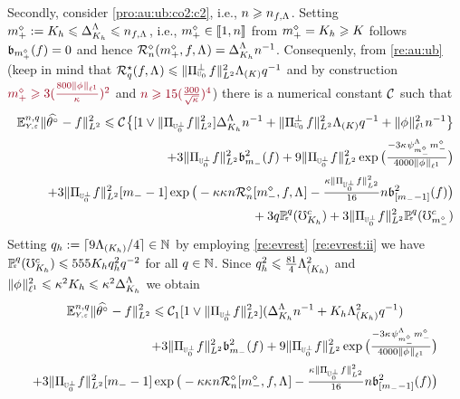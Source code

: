 \begin{pro}
Secondly, consider \ref{pro:au:ub:co2:c2}, i.e., 
$\ssY\geq\ssY_{\xdf,\iSv}$. Setting $\pdDi:=K_{\ydf}\leq\DipenSv[K_{\ydf}]\leq\ssY_{\xdf,\iSv}$, i.e., $\pdDi\in\nset{1,\ssY}$ from $\pdDi=K_{\ydf}\geq K$  follows
$\bias[\pdDi](\xdf)=0$ and hence
$\hRa{\pdDi,\xdf,\iSv}=\DipenSv[K_{\ydf}]\ssY^{-1}$. Consequenly, from
\cref{re:au:ub} (keep in mind that
$\mRa{\xdf,\iSv}\leq\VnormLp{\Proj[{\mHiH[0]}]^\perp\xdf}^2\miSv[K]\ssE^{-1}$
and by construction $\dr\pdDi\geq3(\tfrac{800\Vnormlp[1]{\fydf}}{\cpen})^2$  and  $\dr n\geq
  15(\tfrac{300}{\sqrt{\cpen}})^4$) there is a numerical constant
  $\cst{}$ such that 
\begin{multline*}
\FuEx[\ssY,\ssE]{\rY,\rE}\VnormLp{\hxdfPr[]-\xdf}^2\leq\cst{}\big\{[1\vee\VnormLp{\Proj[{\mHiH[0]^\perp}]\xdf}^2]\DipenSv[K_{\ydf}]\ssY^{-1}+\VnormLp{\Proj[{\mHiH[0]}]^\perp\xdf}^2\miSv[K]\ssE^{-1}+\Vnormlp[1]{\fydf}^2\ssY^{-1}\big\}
\\
\hfill+3\VnormLp{\Proj[{\mHiH[0]^\perp}]\xdf}^2\bias[\mDi]^2(\xdf)+9
\VnormLp{\Proj[{\mHiH[0]^\perp}]\xdf}^2\exp\big(\tfrac{-3\cpen\cmiSv[\mdDi]\mdDi}{4000\Vnormlp[1]{\fydf}}\big)
\\\hfill
+3
\VnormLp{\Proj[{\mHiH[0]^\perp}]\xdf}^2[\mDi-1]\exp\big(-\rWc\cpen\ssY\hRaDi{\mdDi,\xdf,\iSv}-
\tfrac{\rWc\VnormLp{\Proj[{\mHiH[0]^\perp}]\xdf}^2}{16}\ssY\bias[{[\mDi-1]}]^2(\xdf)\big)\\\null\hfill
+3\ssE\FuVg[\ssE]{\rE}(\aixEv[K_{\ydf}]^c)+3
\VnormLp{\Proj[{\mHiH[0]^\perp}]\xdf}^2\FuVg[\ssE]{\rE}(\aixEv[\mdDi]^c)
  \end{multline*}
Setting
$\ssE_{\ydf}:=\ceil{9\miSv[K_{\ydf}]/4}\in\Nz$ by employing \cref{re:evrest}
\ref{re:evrest:ii} we have $\FuVg[\ssE]{\rE}(\aixEv[K_{\ydf}]^c)\leq 555
K_{\ydf}\ssE_{\ydf}^2 \ssE^{-2}$ for all $\ssE\in\Nz$. Since $\ssE_{\ydf}^2\leq\tfrac{81}{4}\miSv[K_{\ydf}]^2$ and 
$\Vnormlp[1]{\fydf}^2\leq\cpen^2K_{\ydf}\leq\cpen^2\DipenSv[K_{\ydf}]$ we obtain
\begin{multline}\label{pro:au:ub:co2:e2}
\FuEx[\ssY,\ssE]{\rY,\rE}\VnormLp{\hxdfPr[]-\xdf}^2\leq\cst{1}[1\vee\VnormLp{\Proj[{\mHiH[0]^\perp}]\xdf}^2](\DipenSv[K_{\ydf}]\ssY^{-1}+K_{\ydf}\miSv[K_{\ydf}]^2\ssE^{-1})
\\
\hfill+3\VnormLp{\Proj[{\mHiH[0]^\perp}]\xdf}^2\bias[\mDi]^2(\xdf)+9
\VnormLp{\Proj[{\mHiH[0]^\perp}]\xdf}^2\exp\big(\tfrac{-3\cpen\cmiSv[\mdDi]\mdDi}{4000\Vnormlp[1]{\fydf}}\big)
\\\hfill
+3
\VnormLp{\Proj[{\mHiH[0]^\perp}]\xdf}^2[\mDi-1]\exp\big(-\rWc\cpen\ssY\hRaDi{\mdDi,\xdf,\iSv}-
\tfrac{\rWc\VnormLp{\Proj[{\mHiH[0]^\perp}]\xdf}^2}{16}\ssY\bias[{[\mDi-1]}]^2(\xdf)\big)\\\null\hfill

\end{multline}
\end{pro}
